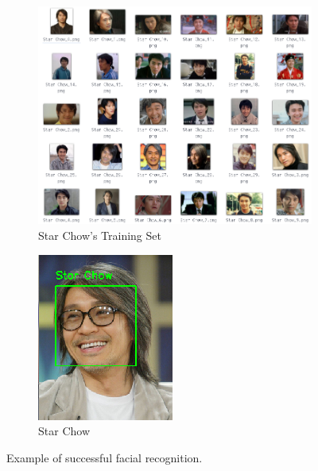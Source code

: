 \begin{figure}[!htb]
  \centering
  \begin{subfigure}[b]{0.65\linewidth}
    \includegraphics[width=\linewidth]{figures/star-chow-training-set.png}
    \caption{Star Chow's Training Set}
  \end{subfigure}
  \hfill
  \begin{subfigure}[b]{0.3\linewidth}
    \includegraphics[width=\linewidth]{figures/star-chow-success.png}
    \caption{Star Chow}
  \end{subfigure}
  \caption{Example of successful facial recognition.}
  \label{fig:correct-recog}
\end{figure}
\vspace{0.5cm}


